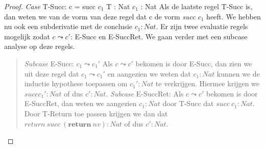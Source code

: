 \begin{proof}
    \indent \textit{Case} T-Succ: c = succ $c_1$ \quad T : Nat \quad $c_1$ : Nat \newline
    Als de laatste regel T-Succ is, dan weten we van de vorm van deze regel dat c de vorm \emph{succ $c_1$} heeft. We hebben nu ook een subderivatie met de conclusie  $c_1 : Nat$. Er zijn twee evaluatie regels mogelijk zodat $c \leadsto c'$: E-Succ en E-SuccRet. We gaan verder met een subcase analyse op deze regels.
    \begin{quote}
        \textit{Subcase} E-Succ: $c_1 \leadsto c_1'$ \newline
        Als $c \leadsto c'$ bekomen is door E-Succ, dan zien we uit deze regel dat $c_1 \leadsto c_1'$ en aangezien we weten dat $c_1 : Nat$ kunnen we de inductie hypothese toepassen om $c_1' : Nat$ te verkrijgen. Hiermee krijgen we $succ c_1' : Nat$ of dus $c' : Nat$. \newline 
        \textit{Subcase} E-SuccRet: \newline 
        Als $c \leadsto c'$ bekomen is door E-SuccRet, dan weten we aangezien $c_1 : Nat$ door T-Succ dat $succ \   c_1 : Nat$. Door T-Return toe passen krijgen we dan dat $return \  succ \  (\textbf{return} \  nv) : Nat$ of dus $c' : Nat$.
    \end{quote}
        

\end{proof}
